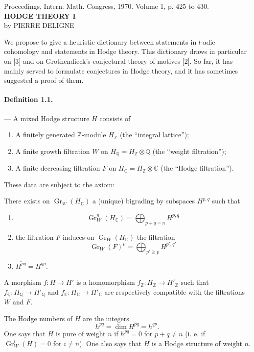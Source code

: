\documentclass[10pt]{article}
\newcommand{\C}{\mathbb C}
\newcommand{\Q}{\mathbb Q}
\newcommand{\Z}{\mathbb Z}
\newcommand{\Gr}{\operatorname{Gr}}
\begin{document}
\begin{center}
{\small Proceedings, Intern. Math. Congress, 1970. Volume 1, p. 425 to 430.}\\[4em]
{\Large\bfseries HODGE THEORY I}\\[1.6em]
{\large by PIERRE DELIGNE}
\end{center}

We propose to give a heuristic dictionary between statements in $l$-adic cohomology and statements in Hodge theory. This dictionary draws in particular on [3] and on Grothendieck's conjectural theory of motives [2]. So far, it has mainly served to formulate conjectures in Hodge theory, and it has sometimes suggested a proof of them.

\paragraph{Definition 1.1.} — A mixed Hodge structure $H$ consists of
\begin{enumerate}[label=(\alph*)]
\item A finitely generated $\Z$-module $H_\Z$ (the “integral lattice”);
\item A finite growth filtration $W$ on $H_\Q=H_\Z\otimes\Q$ (the “weight filtration”); %
\item A finite decreasing filtration $F$ on $H_\C=H_\Z\otimes\C$ (the “Hodge filtration”).
\end{enumerate}
These data are subject to the axiom:

There exists on $\Gr_W(H_\C)$ a (unique) bigrading by subspaces $H^{p,q}$ such that
\begin{enumerate}[label=(\roman*)]
\item
\[
\Gr_W^n(H_\C)=\bigoplus_{p+q=n}H^{p,q}
\]
\item the filtration $F$ induces on $\Gr_W(H_\C)$ the filtration
\[
\Gr_W(F)^p=\bigoplus_{p'\ge p}H^{p',q'}
\]
\item $\overline{H^{pq}}=H^{qp}$.
\end{enumerate}
A morphism $f:H\to H'$ is a homomorphism $f_\Z:H_\Z\to H'_\Z$ such that $f_\Q:H_\Q\to H'_\Q$ and $f_\C:H_\C\to H'_\C$ are respectively compatible with the filtrations $W$ and $F$.

The Hodge numbers of $H$ are the integers
\[
\tag{1.2}
h^{pq}=\dim H^{pq}=h^{qp}.
\]
One says that $H$ is pure of weight $n$ if $h^{pq}=0$ for $p+q\ne n$ (i. e. if $\Gr_W^i(H)=0$ for $i\ne n$). One also says that $H$ is a Hodge structure of weight $n$.
\end{document}
